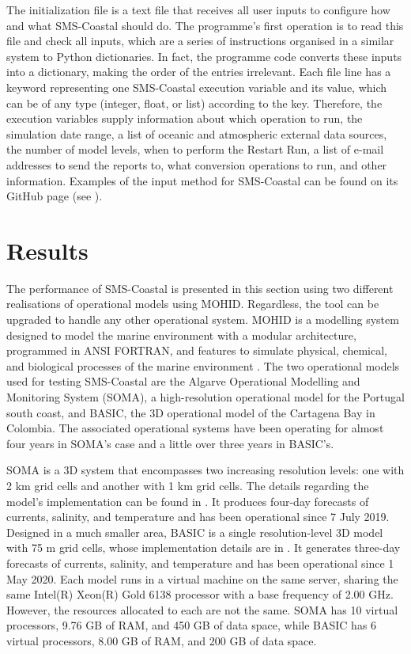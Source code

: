 The initialization file is a text file that receives all user inputs to configure how and what SMS-Coastal should do. The programme's first operation is to read this file and check all inputs, which are a series of instructions organised in a similar system to Python dictionaries. In fact, the programme code converts these inputs into a dictionary, making the order of the entries irrelevant. Each file line has a keyword representing one SMS-Coastal execution variable and its value, which can be of any type (integer, float, or list) according to the key. Therefore, the execution variables supply information about which operation to run, the simulation date range, a list of oceanic and atmospheric external data sources, the number of model levels, when to perform the Restart Run, a list of e-mail addresses to send the reports to, what conversion operations to run, and other information. Examples of the input method for SMS-Coastal can be found on its GitHub page (see ).

\section{Results} \label{sec:cp4_results}
The performance of SMS-Coastal is presented in this section using two different realisations of operational models using MOHID. Regardless, the tool can be upgraded to handle any other operational system. MOHID is a modelling system designed to model the marine environment with a modular architecture, programmed in ANSI FORTRAN, and features to simulate physical, chemical, and biological processes of the marine environment \parencite{neves2007numerical, braunschweig2004object, sobrinho2021improving, garneau2017modelling}. The two operational models used for testing SMS-Coastal are the Algarve Operational Modelling and Monitoring System (SOMA), a high-resolution operational model for the Portugal south coast, and BASIC, the 3D operational model of the Cartagena Bay in Colombia. The associated operational systems have been operating for almost four years in SOMA's case and a little over three years in BASIC's.

SOMA is a 3D system that encompasses two increasing resolution levels: one with 2 km grid cells and another with 1 km grid cells. The details regarding the model's implementation can be found in \textcite{janeiro2017integrating}. It produces four-day forecasts of currents, salinity, and temperature and has been operational since 7 July 2019. Designed in a much smaller area, BASIC is a single resolution-level 3D model with 75 m grid cells, whose implementation details are in \textcite{tosic2019hydrodynamic}. It generates three-day forecasts of currents, salinity, and temperature and has been operational since 1 May 2020. Each model runs in a virtual machine on the same server, sharing the same Intel(R) Xeon(R) Gold 6138 processor with a base frequency of 2.00 GHz. However, the resources allocated to each are not the same. SOMA has 10 virtual processors, 9.76 GB of RAM, and 450 GB of data space, while BASIC has 6 virtual processors, 8.00 GB of RAM, and 200 GB of data space.

